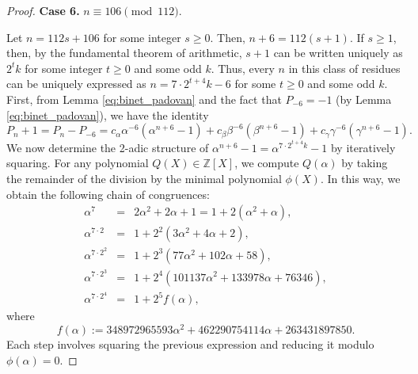 \documentclass[11pt,a4paper]{article}
\numberwithin{equation}{section}
\numberwithin{table}{section}
\numberwithin{figure}{section}
\begin{document}
\begin{proof}
	\medskip
	\noindent\textbf{Case 6.} $n\equiv 106\pmod{112}$.
	
Let $n=112s+106$ for some integer $s\ge 0$. Then, $n+6=112(s+1)$. If $s\ge 1$, then, by the fundamental theorem of arithmetic, $s+1$ can be written uniquely as $2^{t}k$ for some integer $t\ge 0$ and some odd $k$. Thus, every $n$ in this class of residues can be uniquely expressed as $n=7\cdot 2^{t+4}k-6$ for some $t\ge 0$ and some odd $k$. First, from Lemma \ref{eq:binet_padovan} and the fact that $P_{-6}=-1$ (by Lemma \ref{eq:binet_padovan}), we have the identity
	\begin{equation}\label{eq:key-case7}
		P_n+1 = P_n - P_{-6} 
		= c_{\alpha}\alpha^{-6}(\alpha^{n+6}-1)
		+c_{\beta}\beta^{-6}(\beta^{n+6}-1)
		+c_{\gamma}\gamma^{-6}(\gamma^{n+6}-1).
	\end{equation}
	We now determine the 2-adic structure of 
	$\alpha^{n+6}-1=\alpha^{7\cdot 2^{t+4}k}-1$ 
	by iteratively squaring. For any polynomial 
	$Q(X)\in\mathbb{Z}[X]$, we compute $Q(\alpha)$ 
	by taking the remainder of the division by the 
	minimal polynomial $\phi(X)$. In this way, 
	we obtain the following chain of congruences:
	\begin{eqnarray}
	\label{eq:alpha}
		\alpha^7 
		&=& 2\alpha^2+2\alpha+1
		= 1+2(\alpha^{2}+\alpha),\nonumber\\
		\alpha^{7\cdot 2} 
		&=& 1+2^2(3\alpha^2+4\alpha+2),\\
		\alpha^{7\cdot 2^2} 
		&=& 1+2^3(77\alpha^2+102\alpha+58),\nonumber\\
		\alpha^{7\cdot 2^3} 
		&=& 1+2^4(101137\alpha^2+133978\alpha+76346),\nonumber\\
		\alpha^{7\cdot 2^4} 
		&=& 1+2^5 f(\alpha),\nonumber
	\end{eqnarray}
	where
	\begin{equation*}
		f(\alpha) := 348972965593\alpha^2
		+462290754114\alpha+263431897850.
	\end{equation*}
	Each step involves squaring the previous expression 
	and reducing it modulo $\phi(\alpha)=0$.
	

\end{proof}
\end{document}

